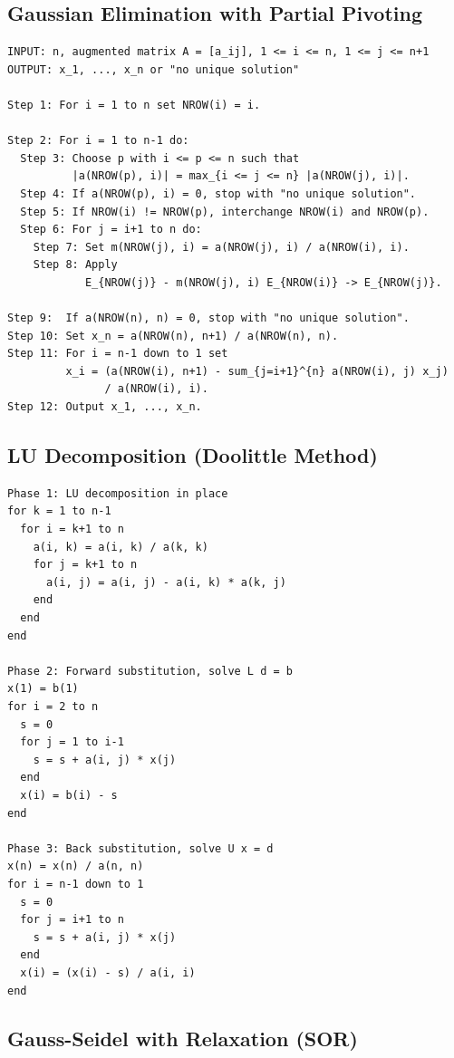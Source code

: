 \subsection{Gaussian Elimination with Partial Pivoting}


\begin{lstlisting}
INPUT: n, augmented matrix A = [a_ij], 1 <= i <= n, 1 <= j <= n+1
OUTPUT: x_1, ..., x_n or "no unique solution"

Step 1: For i = 1 to n set NROW(i) = i.

Step 2: For i = 1 to n-1 do:
  Step 3: Choose p with i <= p <= n such that
          |a(NROW(p), i)| = max_{i <= j <= n} |a(NROW(j), i)|.
  Step 4: If a(NROW(p), i) = 0, stop with "no unique solution".
  Step 5: If NROW(i) != NROW(p), interchange NROW(i) and NROW(p).
  Step 6: For j = i+1 to n do:
    Step 7: Set m(NROW(j), i) = a(NROW(j), i) / a(NROW(i), i).
    Step 8: Apply
            E_{NROW(j)} - m(NROW(j), i) E_{NROW(i)} -> E_{NROW(j)}.

Step 9:  If a(NROW(n), n) = 0, stop with "no unique solution".
Step 10: Set x_n = a(NROW(n), n+1) / a(NROW(n), n).
Step 11: For i = n-1 down to 1 set
         x_i = (a(NROW(i), n+1) - sum_{j=i+1}^{n} a(NROW(i), j) x_j)
               / a(NROW(i), i).
Step 12: Output x_1, ..., x_n.
\end{lstlisting}

\subsection{LU Decomposition (Doolittle Method)}


\begin{lstlisting}
Phase 1: LU decomposition in place
for k = 1 to n-1
  for i = k+1 to n
    a(i, k) = a(i, k) / a(k, k)
    for j = k+1 to n
      a(i, j) = a(i, j) - a(i, k) * a(k, j)
    end
  end
end

Phase 2: Forward substitution, solve L d = b
x(1) = b(1)
for i = 2 to n
  s = 0
  for j = 1 to i-1
    s = s + a(i, j) * x(j)
  end
  x(i) = b(i) - s
end

Phase 3: Back substitution, solve U x = d
x(n) = x(n) / a(n, n)
for i = n-1 down to 1
  s = 0
  for j = i+1 to n
    s = s + a(i, j) * x(j)
  end
  x(i) = (x(i) - s) / a(i, i)
end
\end{lstlisting}

\subsection{Gauss-Seidel with Relaxation (SOR)}


